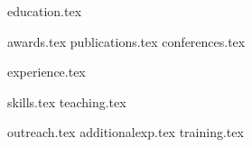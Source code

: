 \documentclass[letterpaper,9pt]{article}
\begin{document}


{education.tex}

{awards.tex}
{publications.tex}
{conferences.tex}

{experience.tex}


{skills.tex}
{teaching.tex}


{outreach.tex}
{additionalexp.tex}
{training.tex}
\end{document}
